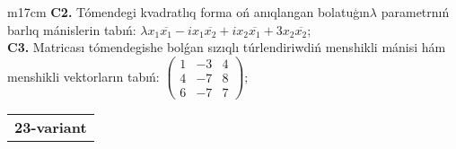 \documentclass{article}
\begin{document}
\begin{tabular}{m{17cm}}
\textbf{C2.} Tómendegi kvadratlıq forma oń anıqlangan bolatuģın\(\lambda\) parametrnıń barlıq mánislerin tabıń: \(\lambda x_{1}\overline{x_{1}} - ix_{1}\overline{x_{2}} + ix_{2}\overline{x_{1}} + 3x_{2}\overline{x_{2}}\); \\
\textbf{C3.} Matricası tómendegishe bolǵan sızıqlı túrlendiriwdiń menshikli mánisi hám menshikli vektorların tabıń: \(\begin{pmatrix} 1 & - 3 & 4 \\ 4 & - 7 & 8 \\ 6 & - 7 & 7 \end{pmatrix}\); \\

\end{tabular}
\vspace{1cm}


\begin{tabular}{m{17cm}}
\textbf{23-variant}
\newline


\end{tabular}
\end{document}
